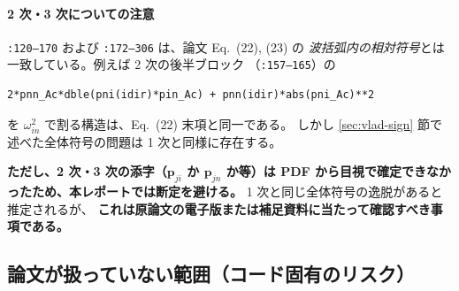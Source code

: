 \documentclass[dvipdfmx,a4paper,11pt]{jsarticle}
\newcommand{\file}[1]{\texttt{#1}}
\newcommand{\vp}{\bm{p}}
\begin{document}
\paragraph{2 次・3 次についての注意}
\file{:120--170} および \file{:172--306} は、論文 Eq.~(22), (23) の
\emph{波括弧内の相対符号}とは一致している。例えば 2 次の後半ブロック
（\file{:157--165}）の
%
\begin{lstlisting}[firstnumber=157,caption={2 次補正の対角 counter-term（抜粋）},numbers=none]
2*pnn_Ac*dble(pni(idir)*pin_Ac) + pnn(idir)*abs(pni_Ac)**2
\end{lstlisting}
%
を $\omega_{in}^2$ で割る構造は、Eq.~(22) 末項と同一である。
しかし \ref{sec:vlad-sign} 節で述べた全体符号の問題は 1 次と同様に存在する。

\textbf{ただし、2 次・3 次の添字（$\vp_{ji}$ か $\vp_{jn}$ か等）は
PDF から目視で確定できなかったため、本レポートでは断定を避ける。}
1 次と同じ全体符号の逸脱があると推定されるが、
\textbf{これは原論文の電子版または補足資料に当たって確認すべき事項である。}

\subsection{論文が扱っていない範囲（コード固有のリスク）}
\end{document}
